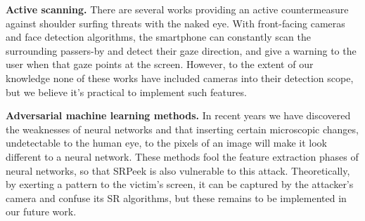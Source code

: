 \vspace{1mm}
\noindent
\textbf{Active scanning.} There are several works providing an active countermeasure against shoulder surfing threats with the naked eye. With front-facing cameras and face detection algorithms, the smartphone can constantly scan the surrounding passers-by and detect their gaze direction, and give a warning to the user when that gaze points at the screen. However, to the extent of our knowledge none of these works have included cameras into their detection scope, but we believe it's practical to implement such features.

\vspace{1mm}
\noindent
\textbf{Adversarial machine learning methods.} In recent years we have discovered the weaknesses of neural networks and that inserting certain microscopic changes, undetectable to the human eye, to the pixels of an image will make it look different to a neural network. These methods fool the feature extraction phases of neural networks, so that SRPeek is also vulnerable to this attack. Theoretically, by exerting a pattern to the victim's screen, it can be captured by the attacker's camera and confuse its SR algorithms, but these remains to be implemented in our future work.

